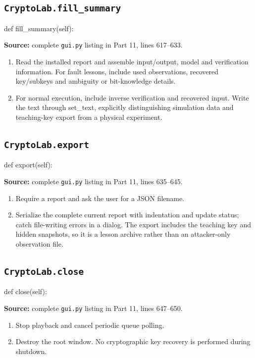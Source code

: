\subsection{\texttt{CryptoLab.fill\_\allowbreak{}summary}}
\begin{lightcode}
def fill_summary(self):
\end{lightcode}
\noindent\textbf{Source:} complete \texttt{gui.py} listing in Part 11, lines 617--633.
\begin{enumerate}
\item Read the installed report and assemble input/output, model and verification information. For fault lessons, include used observations, recovered key/subkeys and ambiguity or bit-knowledge details.
\item For normal execution, include inverse verification and recovered input. Write the text through set\_text, explicitly distinguishing simulation data and teaching-key export from a physical experiment.
\end{enumerate}
\subsection{\texttt{CryptoLab.export}}
\begin{lightcode}
def export(self):
\end{lightcode}
\noindent\textbf{Source:} complete \texttt{gui.py} listing in Part 11, lines 635--645.
\begin{enumerate}
\item Require a report and ask the user for a JSON filename.
\item Serialize the complete current report with indentation and update status; catch file-writing errors in a dialog. The export includes the teaching key and hidden snapshots, so it is a lesson archive rather than an attacker-only observation file.
\end{enumerate}
\subsection{\texttt{CryptoLab.close}}
\begin{lightcode}
def close(self):
\end{lightcode}
\noindent\textbf{Source:} complete \texttt{gui.py} listing in Part 11, lines 647--650.
\begin{enumerate}
\item Stop playback and cancel periodic queue polling.
\item Destroy the root window. No cryptographic key recovery is performed during shutdown.
\end{enumerate}

